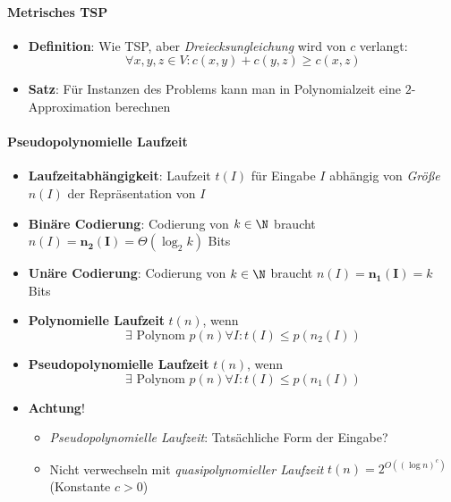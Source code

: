 \paragraph{Metrisches TSP}
\begin{itemize}
  \item \textbf{Definition}: Wie TSP, aber \emph{Dreiecksungleichung} wird von $ c $ verlangt:
  \begin{equation*}
    \forall x, y, z \in V : c(x,y) + c(y,z) \geq c(x,z)
  \end{equation*}
  \item \textbf{Satz}: Für Instanzen des Problems kann man in Polynomialzeit eine $ 2 $-Approximation berechnen
\end{itemize}

\paragraph{Pseudopolynomielle Laufzeit}
\begin{itemize}
  \item \textbf{Laufzeitabhängigkeit}: Laufzeit $ t(I) $ für Eingabe $ I $ abhängig von \emph{Größe} $ n(I) $ der Repräsentation von $ I $
  \item \textbf{Binäre Codierung}: Codierung von $ k \in \N $ braucht $ n(I) = \bm{n_2(I)} = \Theta(\log_2 k) $ Bits
  \item \textbf{Unäre Codierung}: Codierung von $ k \in \N $ braucht $ n(I) = \bm{n_1(I)} = k $ Bits
  \item \textbf{Polynomielle Laufzeit} $ t(n) $, wenn
    \begin{equation*}
      \exists \text{ Polynom } p(n) \forall I : t(I) \leq p(n_2(I))
    \end{equation*}
  \item \textbf{Pseudopolynomielle Laufzeit} $ t(n) $, wenn
    \begin{equation*}
      \exists \text{ Polynom } p(n) \forall I : t(I) \leq p(n_1(I))
    \end{equation*}
  \item \textbf{Achtung}!
  \begin{itemize}
    \item \emph{Pseudopolynomielle Laufzeit}: Tatsächliche Form der Eingabe? 
    \item Nicht verwechseln mit \emph{quasipolynomieller Laufzeit} $ t(n) = 2^{O((\log n)^c)} $ (Konstante $ c > 0 $)
  \end{itemize}
\end{itemize}

